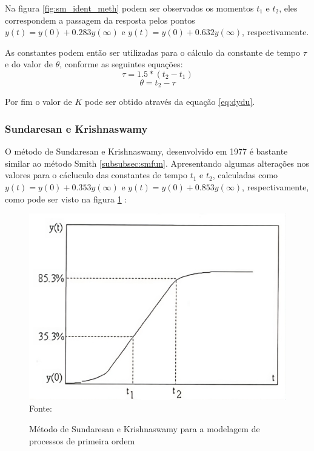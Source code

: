 Na figura \ref{fig:sm_ident_meth} podem ser observados os momentos $t_1$ e $t_2$, eles correspondem a passagem da resposta
pelos pontos $y(t) = y(0) + 0.283y(\infty)$ e $y(t) = y(0) + 0.632y(\infty)$, respectivamente.

As constantes podem então ser utilizadas para o cálculo da constante de tempo $\tau$ e do valor de $\theta$,
conforme as seguintes equações:
\begin{equation}
    \label{eq:smtau}
    \tau = 1.5*(t_2 - t_1)
\end{equation}
\begin{equation}
    \label{eq:smtheta}
    \theta = t_2 - \tau
\end{equation}

Por fim o valor de $K$ pode ser obtido através da equação \eqref{eq:dydu}.

\subsubsection{Sundaresan e Krishnaswamy}\label{subsubsec:skfun}

O método de Sundaresan e Krishnaswamy, desenvolvido em 1977 é bastante similar ao método Smith \ref{subsubsec:smfun}.
Apresentando algumas alterações nos valores para o cácluculo das constantes de tempo $t_1$ e $t_2$, calculadas como
$y(t) = y(0) + 0.353y(\infty)$ e $y(t) = y(0) + 0.853y(\infty)$, respectivamente, como pode ser visto na figura
\ref{fig:sd_kr_ident_meth} \cite{CoelhoIdentificacao}:


\begin{figure}[H]
    \centering
    \caption{Método de Sundaresan e Krishnaswamy para a modelagem de processos de primeira ordem }
    \includegraphics[scale=0.3]{figuras/sd_kr_ident_meth}
    \label{fig:sd_kr_ident_meth}
    \\
    \vspace{0cm}\hspace{0cm}\small{Fonte: \cite{CoelhoIdentificacao}}
\end{figure}

